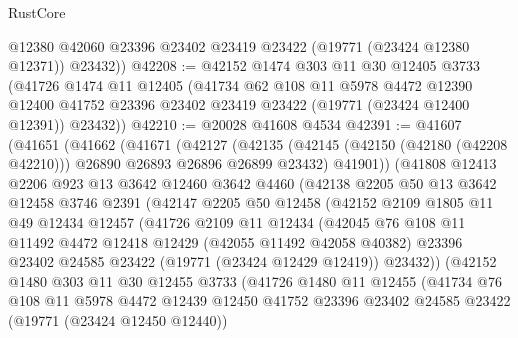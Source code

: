 \begin{lexlean}{RustCore}
\begin{coremodule}
        @12380
        @42060
        @23396
        @23402
        @23419
        @23422
        (@19771 (@23424 @12380 @12371))
        @23432))
@42208 := @42152
    @1474
    @303
    @11
    @30
    @12405
    @3733
    (@41726
      @1474
      @11
      @12405
      (@41734
        @62
        @108
        @11
        @5978
        @4472
        @12390
        @12400
        @41752
        @23396
        @23402
        @23419
        @23422
        (@19771 (@23424 @12400 @12391))
        @23432))
@42210 := @20028 @41608 @4534
@42391 := @41607
    (@41651
      (@41662
        (@41671
          (@42127
            (@42135
              (@42145 (@42150 (@42180 (@42208 @42210))) @26890 @26893 @26896 @26899 @23432)
              @41901))
          (@41808
            @12413
            @2206
            @923
            @13
            @3642
            @12460
            @3642
            @4460
            (@42138
              @2205
              @50
              @13
              @3642
              @12458
              @3746
              @2391
              (@42147
                @2205
                @50
                @12458
                (@42152
                  @2109
                  @1805
                  @11
                  @49
                  @12434
                  @12457
                  (@41726
                    @2109
                    @11
                    @12434
                    (@42045
                      @76
                      @108
                      @11
                      @11492
                      @4472
                      @12418
                      @12429
                      (@42055 @11492 @42058 @40382)
                      @23396
                      @23402
                      @24585
                      @23422
                      (@19771 (@23424 @12429 @12419))
                      @23432))
                  (@42152
                    @1480
                    @303
                    @11
                    @30
                    @12455
                    @3733
                    (@41726
                      @1480
                      @11
                      @12455
                      (@41734
                        @76
                        @108
                        @11
                        @5978
                        @4472
                        @12439
                        @12450
                        @41752
                        @23396
                        @23402
                        @24585
                        @23422
                        (@19771 (@23424 @12450 @12440))

\end{coremodule}
\end{lexlean}
